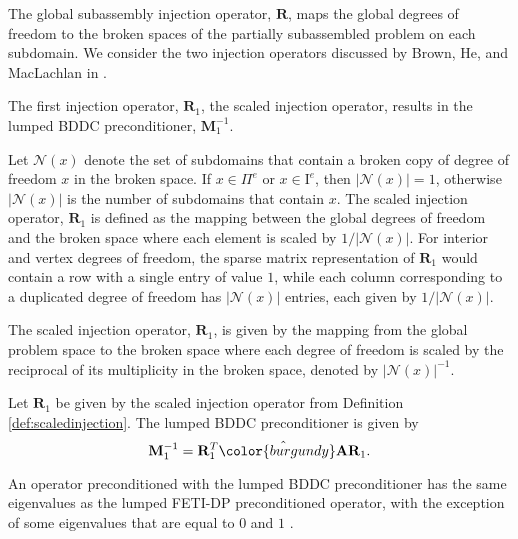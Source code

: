 The global subassembly injection operator, $\mathbf{R}$, maps the global degrees of freedom to the broken spaces of the partially subassembled problem on each subdomain.
We consider the two injection operators discussed by Brown, He, and MacLachlan in \cite{brown2019local}.

The first injection operator, $\mathbf{R}_1$, the scaled injection operator, results in the lumped BDDC preconditioner, $\mathbf{M}^{-1}_1$.

Let $\mathcal{N} \left( x \right)$ denote the set of subdomains that contain a broken copy of degree of freedom $x$ in the broken space.
If $x \in \Pi^e$ or $x \in \text{I}^e$, then $\lvert \mathcal{N} \left( x \right) \rvert = 1$, otherwise $\lvert \mathcal{N} \left( x \right) \rvert$ is the number of subdomains that contain $x$.
The scaled injection operator, $\mathbf{R}_1$ is defined as the mapping between the global degrees of freedom and the broken space where each element is scaled by $1 / \lvert \mathcal{N} \left( x \right) \rvert$.
For interior and vertex degrees of freedom, the sparse matrix representation of $\mathbf{R}_1$ would contain a row with a single entry of value $1$, while each column corresponding to a duplicated degree of freedom has $\lvert \mathcal{N} \left( x \right) \rvert$ entries, each given by $1 / \lvert \mathcal{N} \left( x \right) \rvert$.

\begin{definition}
The scaled injection operator, $\mathbf{R}_1$, is given by the mapping from the global problem space to the broken space where each degree of freedom is scaled by the reciprocal of its multiplicity in the broken space, denoted by $\lvert \mathcal{N} \left( x \right) \rvert^{-1}$.
\label{def:scaledinjection}
\end{definition}

\begin{definition}
Let $\mathbf{R}_1$ be given by the scaled injection operator from Definition \ref{def:scaledinjection}.
The lumped BDDC preconditioner is given by
\begin{equation}
\mathbf{M}^{-1}_1 = \mathbf{R}_1^T \hat{\color{burgundy}\mathbf{A}} \mathbf{R}_1.
\end{equation}
\label{def:lumpedbddc}
\end{definition}

An operator preconditioned with the lumped BDDC preconditioner has the same eigenvalues as the lumped FETI-DP preconditioned operator, with the exception of some eigenvalues that are equal to $0$ and $1$ \cite{li2007use}.

